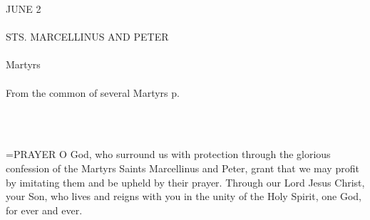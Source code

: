 \begin{center}\normalsize \begin{center}\normalsize JUNE 2\\\\
\footnotesize \footnotesize STS. MARCELLINUS AND PETER\\\\
\footnotesize \footnotesize Martyrs\\\\
\footnotesize \footnotesize From the common of several Martyrs p. \\\\
\footnotesize \end{center}\\
\end{center}

\hangindent=\parindent \small{PRAYER 
O God, who surround us with protection
through the glorious confession
of the Martyrs Saints Marcellinus and Peter,
grant that we may profit by imitating them
and be upheld by their prayer.
Through our Lord Jesus Christ, your Son,
who lives and reigns with you in the unity of the Holy Spirit,
one God, for ever and ever.\\}
 
